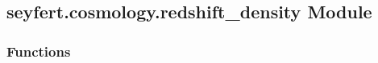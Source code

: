 \documentclass[letterpaper,10pt,english]{sphinxmanual}
\begin{document}
\subsection{seyfert.cosmology.redshift\_density Module}
\label{\detokenize{redshift_density:module-seyfert.cosmology.redshift_density}}\label{\detokenize{redshift_density:seyfert-cosmology-redshift-density-module}}

\subsubsection{Functions}
\label{\detokenize{redshift_density:functions}}
\end{document}
